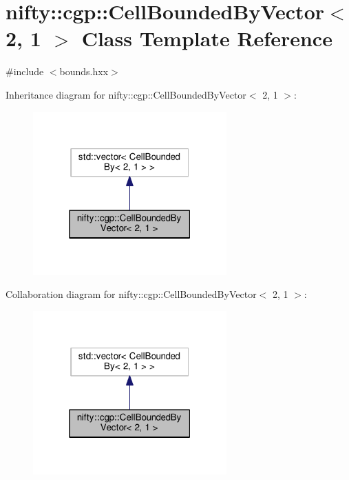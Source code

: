 \hypertarget{classnifty_1_1cgp_1_1CellBoundedByVector_3_012_00_011_01_4}{}\section{nifty\+:\+:cgp\+:\+:Cell\+Bounded\+By\+Vector$<$ 2, 1 $>$ Class Template Reference}
\label{classnifty_1_1cgp_1_1CellBoundedByVector_3_012_00_011_01_4}


{\ttfamily \#include $<$bounds.\+hxx$>$}



Inheritance diagram for nifty\+:\+:cgp\+:\+:Cell\+Bounded\+By\+Vector$<$ 2, 1 $>$\+:\nopagebreak
\begin{figure}[H]
\begin{center}
\leavevmode
\includegraphics[width=211pt]{classnifty_1_1cgp_1_1CellBoundedByVector_3_012_00_011_01_4__inherit__graph}
\end{center}
\end{figure}


Collaboration diagram for nifty\+:\+:cgp\+:\+:Cell\+Bounded\+By\+Vector$<$ 2, 1 $>$\+:\nopagebreak
\begin{figure}[H]
\begin{center}
\leavevmode
\includegraphics[width=211pt]{classnifty_1_1cgp_1_1CellBoundedByVector_3_012_00_011_01_4__coll__graph}
\end{center}
\end{figure}
